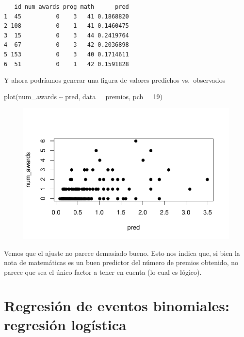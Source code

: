 \documentclass[
  letterpaper,
  DIV=11,
  numbers=noendperiod]{scrreprt}
\newenvironment{Shaded}{\begin{snugshade}}{\end{snugshade}}
\newcommand{\AttributeTok}[1]{\textcolor[rgb]{0.40,0.45,0.13}{#1}}
\newcommand{\DecValTok}[1]{\textcolor[rgb]{0.68,0.00,0.00}{#1}}
\newcommand{\FunctionTok}[1]{\textcolor[rgb]{0.28,0.35,0.67}{#1}}
\newcommand{\NormalTok}[1]{\textcolor[rgb]{0.00,0.23,0.31}{#1}}
\newcommand{\SpecialCharTok}[1]{\textcolor[rgb]{0.37,0.37,0.37}{#1}}
\begin{document}
\begin{verbatim}
   id num_awards prog math      pred
1  45          0    3   41 0.1868820
2 108          0    1   41 0.1460475
3  15          0    3   44 0.2419764
4  67          0    3   42 0.2036898
5 153          0    3   40 0.1714611
6  51          0    1   42 0.1591828
\end{verbatim}

Y ahora podríamos generar una figura de valores predichos vs.~observados

\begin{Shaded}
\begin{Highlighting}[]
\FunctionTok{plot}\NormalTok{(num\_awards }\SpecialCharTok{\textasciitilde{}}\NormalTok{ pred, }\AttributeTok{data =}\NormalTok{ premios, }\AttributeTok{pch =} \DecValTok{19}\NormalTok{) }
\end{Highlighting}
\end{Shaded}

\begin{figure}[H]

{\centering \includegraphics{02_GLM_files/figure-pdf/unnamed-chunk-7-1.pdf}

}

\end{figure}

Vemos que el ajuste no parece demasiado bueno. Esto nos indica que, si
bien la nota de matemáticas es un buen predictor del número de premios
obtenido, no parece que sea el único factor a tener en cuenta (lo cual
es lógico).

\hypertarget{regresiuxf3n-de-eventos-binomiales-regresiuxf3n-loguxedstica}{%
\section{Regresión de eventos binomiales: regresión
logística}\label{regresiuxf3n-de-eventos-binomiales-regresiuxf3n-loguxedstica}}
\end{document}
